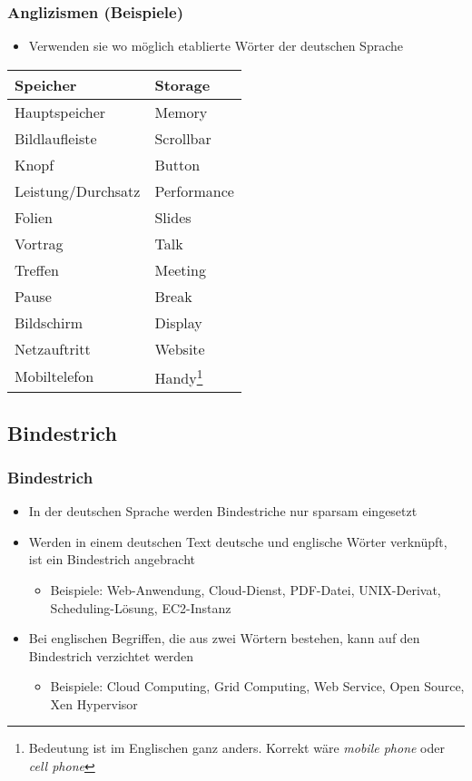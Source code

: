 \documentclass{beamer}
\begin{document}
\begin{frame}
\frametitle{Anglizismen (Beispiele)}
\begin{itemize}
\item Verwenden sie wo möglich etablierte Wörter der deutschen Sprache
\end{itemize}

\begin{center}
\begin{tabular}{|l|l|}
\hline
Speicher             & Storage     \\\hline
Hauptspeicher        & Memory      \\\hline
Bildlaufleiste       & Scrollbar   \\\hline
Knopf                & Button      \\\hline
Leistung/Durchsatz   & Performance \\\hline
Folien               & Slides      \\\hline
Vortrag              & Talk        \\\hline
Treffen              & Meeting     \\\hline
Pause                & Break       \\\hline
Bildschirm           & Display     \\\hline
Netzauftritt         & Website     \\\hline
Mobiltelefon         & Handy\footnote{Bedeutung ist im Englischen ganz anders. Korrekt wäre \emph{mobile phone} oder \emph{cell phone}} \\\hline
\end{tabular}
\end{center}
\end{frame}

\subsection{Bindestrich}
\begin{frame}
\frametitle{Bindestrich}
\begin{itemize}
\item In der deutschen Sprache werden Bindestriche nur sparsam eingesetzt
\item Werden in einem deutschen Text deutsche und englische Wörter verknüpft, ist ein Bindestrich angebracht
\begin{itemize}
\item Beispiele: Web-Anwendung, Cloud-Dienst, PDF-Datei, UNIX-Derivat, Scheduling-Lösung, EC2-Instanz
\end{itemize}
\item Bei englischen Begriffen, die aus zwei Wörtern bestehen, kann auf den Bindestrich verzichtet werden
\begin{itemize}
\item Beispiele: Cloud Computing, Grid Computing, Web Service, Open Source, Xen Hypervisor
\end{itemize}
\end{itemize}
\end{frame}
\end{document}
